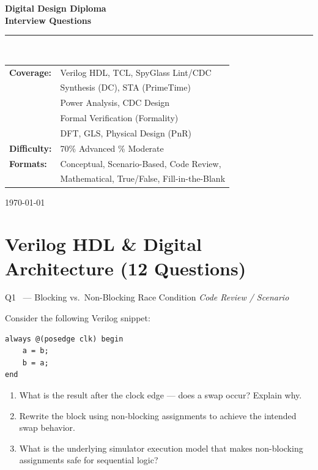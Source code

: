 \documentclass[12pt,a4paper]{article}
\newcommand{\advanced}{%
  \fbox{\textcolor{advred}{\bfseries\sffamily\small ADVANCED}}}
\begin{document}
\begin{titlepage}
\pagecolor{dkblue}
\color{white}
\centering
\vspace*{3cm}

{\Huge\bfseries\sffamily Digital Design Diploma}\\[0.5em]
{\huge\bfseries{} Interview Questions}\\[2em]
\rule{0.6\textwidth}{1pt}\\[2em]

{\large\sffamily
\begin{tabular}{ll}
\textbf{Coverage:} & Verilog HDL, TCL, SpyGlass Lint/CDC\\
 & Synthesis (DC), STA (PrimeTime)\\
 & Power Analysis, CDC Design\\
 & Formal Verification (Formality)\\
 & DFT, GLS, Physical Design (PnR)\\[1em]
\textbf{Difficulty:} & 70\% Advanced \quad 30\% Moderate\\[0.5em]
\textbf{Formats:} & Conceptual, Scenario-Based, Code Review,\\
 & Mathematical, True/False, Fill-in-the-Blank\\
\end{tabular}
}

\vfill
{\large\sffamily\today}
\end{titlepage}
\pagecolor{white}\color{black}

\tableofcontents
\clearpage

\section{Verilog HDL \& Digital Architecture (12 Questions)}
\label{sec:verilog}

\begin{questionbox}{Q1 \advanced\ --- Blocking vs.\ Non-Blocking Race Condition \hfill\textit{Code Review / Scenario}}

Consider the following Verilog snippet:

\begin{lstlisting}[style=verilogstyle]
always @(posedge clk) begin
    a = b;
    b = a;
end
\end{lstlisting}

\begin{enumerate}[label=\textbf{\alph*)}]
  \item What is the result after the clock edge --- does a swap occur? Explain why.
  \item Rewrite the block using non-blocking assignments to achieve the intended swap behavior.
  \item What is the underlying simulator execution model that makes non-blocking assignments safe for sequential logic?
\end{enumerate}
\end{questionbox}
\end{document}
